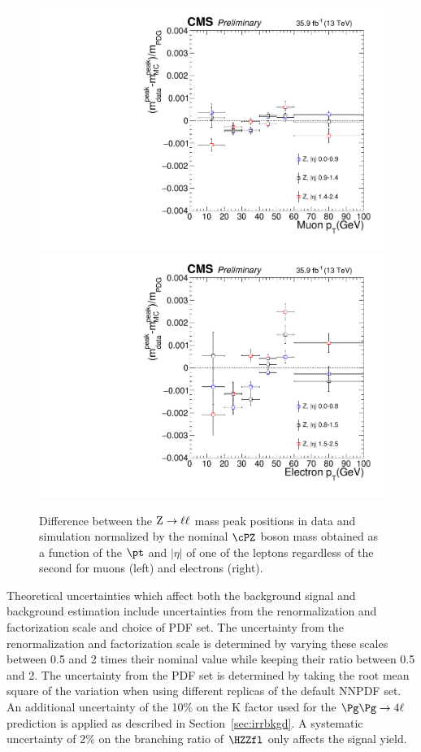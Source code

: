 \begin{figure}[!htb]
\begin{center}
\includegraphics[width=0.44\linewidth]{Figures/Systematic/mass/lepScale_vs_pt_eta_mu.pdf}
\includegraphics[width=0.44\linewidth]{Figures/Systematic/mass/lepScale_vs_pt_eta_e.pdf}
\caption{ Difference between the ${\rm Z}\rightarrow\ell\ell$ mass peak positions in data and simulation normalized by the 
nominal $\cPZ$ boson mass obtained as a function of the $\pt$ and $|\eta|$ of one of the leptons regardless of the second
for muons (left) and electrons (right).
\label{fig:lepScale_16}}
\end{center}
\end{figure}

Theoretical uncertainties which affect both the background signal and background estimation 
include uncertainties from the renormalization and factorization scale and choice of PDF set. 
The uncertainty from the renormalization and factorization scale is determined by varying these scales between 
0.5 and 2 times their nominal value while keeping their ratio between 0.5 and 2. 
The uncertainty from the PDF set is determined 
by taking the root mean square of the variation when using different replicas of the default NNPDF set. An additional
uncertainty of the 10\% on the K factor used for the $\ggZZ$ prediction is applied as described in Section~\ref{sec:irrbkgd}.
A systematic uncertainty of 2\% on the branching ratio of $\HZZfl$ only affects the signal yield. 

